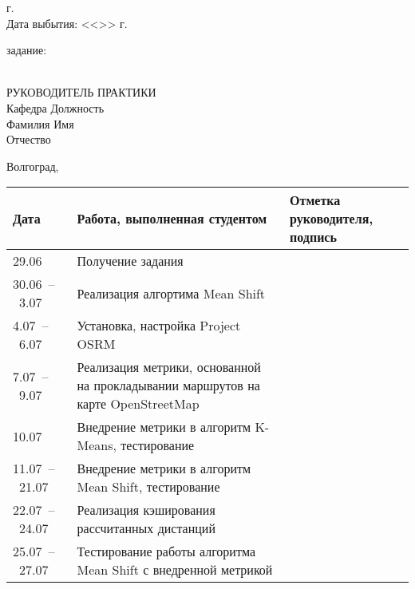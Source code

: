 \begin{titlepage}
\begin{flushleft}
        \the\year г.\\
        Дата выбытия: \hspace{3.1cm}<<\underline{\hspace{1cm}}>> \underline{\hspace{3cm}}
        \the\year г.
    \end{flushleft}
    \vspace{0.25cm}
     задание: \underline{\hspace{11.25cm}}\\
    \underline{\hspace{\textwidth}}\\
    \vspace{0.25cm}
    \begin{flushleft}
        РУКОВОДИТЕЛЬ ПРАКТИКИ\\
        Кафедра \underline{\hspace{5cm}} Должность \underline{\hspace{5cm}} \\
        Фамилия \underline{\hspace{5cm}} Имя \underline{\hspace{6.5cm}}\\
        Отчество \underline{\hspace{5cm}}
    \end{flushleft}
    \vspace{\fill}
    \begin{center}
        Волгоград, \the\year
    \end{center}
\end{titlepage}
\begin{table}[h!]
    \centering
    \begin{tabular}{|m{}|m{}|m{}|}
        \hline
        Дата & Работа, выполненная студентом & Отметка
        руководителя, подпись \\ \hline
        29.06 & Получение задания & \\ \hline
        30.06~--~3.07 & Реализация алгортима Mean Shift & \\ \hline
        4.07~--~6.07 & Установка, настройка Project OSRM & \\ \hline
        7.07~--~9.07 & Реализация метрики, основанной на прокладывании маршрутов на
            карте OpenStreetMap & \\ \hline
        10.07 & Внедрение метрики в алгоритм K-Means, тестирование & \\ \hline
        11.07~--~21.07 & Внедрение метрики в алгоритм Mean Shift, тестирование & \\ \hline
        22.07~--~24.07 & Реализация кэширования рассчитанных дистанций & \\ \hline
        25.07~--~27.07 & Тестирование работы алгоритма Mean Shift с внедренной метрикой & \\ \hline
    \end{tabular}
\end{table}
